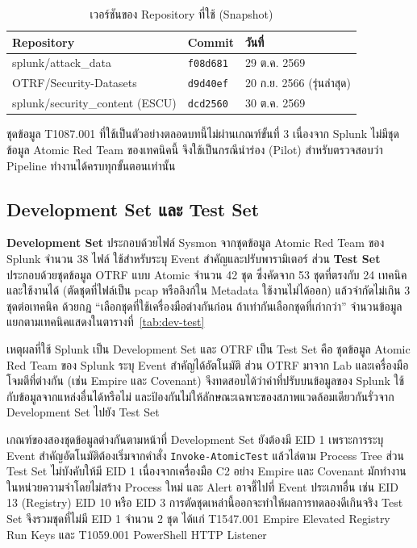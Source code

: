 \begin{table}[ht]
  \centering
  \caption{เวอร์ชันของ Repository ที่ใช้ (Snapshot)}
  \label{tab:snapshot}
  \small
  \begin{tabular}{|l|l|l|}
    \hline
    \textbf{Repository} & \textbf{Commit} & \textbf{วันที่} \\ \hline
    splunk/attack\_data & \texttt{f08d681} & 29 ต.ค. 2569 \\ \hline
    OTRF/Security-Datasets & \texttt{d9d40ef} & 20 ก.ย. 2566 (รุ่นล่าสุด) \\ \hline
    splunk/security\_content (ESCU) & \texttt{dcd2560} & 30 ต.ค. 2569 \\ \hline
  \end{tabular}
\end{table}

ชุดข้อมูล T1087.001 ที่ใช้เป็นตัวอย่างตลอดบทนี้ไม่ผ่านเกณฑ์ขั้นที่ 3
เนื่องจาก Splunk ไม่มีชุดข้อมูล Atomic Red Team ของเทคนิคนี้
จึงใช้เป็นกรณีนำร่อง (Pilot) สำหรับตรวจสอบว่า Pipeline ทำงานได้ครบทุกขั้นตอนเท่านั้น

\subsection{Development Set และ Test Set}
\textbf{Development Set} ประกอบด้วยไฟล์ Sysmon จากชุดข้อมูล Atomic Red Team ของ Splunk จำนวน 38 ไฟล์
ใช้สำหรับระบุ Event สำคัญและปรับพารามิเตอร์ ส่วน \textbf{Test Set} ประกอบด้วยชุดข้อมูล OTRF แบบ Atomic จำนวน 42 ชุด
ซึ่งคัดจาก 53 ชุดที่ตรงกับ 24 เทคนิคและใช้งานได้ (ตัดชุดที่ไฟล์เป็น pcap หรือลิงก์ใน Metadata ใช้งานไม่ได้ออก)
แล้วจำกัดไม่เกิน 3 ชุดต่อเทคนิค ด้วยกฎ ``เลือกชุดที่ใช้เครื่องมือต่างกันก่อน ถ้าเท่ากันเลือกชุดที่เก่ากว่า''
จำนวนข้อมูลแยกตามเทคนิคแสดงในตารางที่~\ref{tab:dev-test}

เหตุผลที่ใช้ Splunk เป็น Development Set และ OTRF เป็น Test Set คือ
ชุดข้อมูล Atomic Red Team ของ Splunk ระบุ Event สำคัญได้อัตโนมัติ
ส่วน OTRF มาจาก Lab และเครื่องมือโจมตีที่ต่างกัน (เช่น Empire และ Covenant)
จึงทดสอบได้ว่าค่าที่ปรับบนข้อมูลของ Splunk ใช้กับข้อมูลจากแหล่งอื่นได้หรือไม่
และป้องกันไม่ให้ลักษณะเฉพาะของสภาพแวดล้อมเดียวกันรั่วจาก Development Set ไปยัง Test Set

เกณฑ์ของสองชุดข้อมูลต่างกันตามหน้าที่ Development Set ยังต้องมี EID 1
เพราะการระบุ Event สำคัญอัตโนมัติต้องเริ่มจากคำสั่ง \texttt{Invoke-AtomicTest} แล้วไล่ตาม Process Tree
ส่วน Test Set ไม่บังคับให้มี EID 1 เนื่องจากเครื่องมือ C2 อย่าง Empire และ Covenant มักทำงานในหน่วยความจำโดยไม่สร้าง Process ใหม่
และ Alert อาจชี้ไปที่ Event ประเภทอื่น เช่น EID 13 (Registry) EID 10 หรือ EID 3
การตัดชุดเหล่านี้ออกจะทำให้ผลการทดลองดีเกินจริง
Test Set จึงรวมชุดที่ไม่มี EID 1 จำนวน 2 ชุด ได้แก่ T1547.001 Empire Elevated Registry Run Keys
และ T1059.001 PowerShell HTTP Listener

